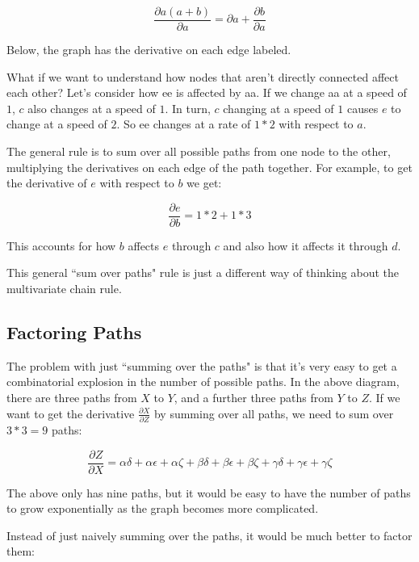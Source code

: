 \documentclass[a4paper,12pt]{report}%
\begin{document}
\begin{equation}
\frac{\partial a(a+b)}{\partial a} = \partial a + \frac{\partial b}{\partial a}
\end{equation}

Below, the graph has the derivative on each edge labeled.

What if we want to understand how nodes that aren’t directly connected affect each other? Let’s consider how ee is affected by aa. If we change aa at a speed of $1$, $c$ also changes at a speed of $1$. In turn, $c$ changing at a speed of $1$ causes $e$ to change at a speed of $2$. So ee changes at a rate of $1*2$ with respect to $a$.

The general rule is to sum over all possible paths from one node to the other, multiplying the derivatives on each edge of the path together. For example, to get the derivative of $e$ with respect to $b$ we get:

\begin{equation}
\frac{\partial e}{\partial b} = 1*2 + 1*3
\end{equation}

This accounts for how $b$ affects $e$ through $c$ and also how it affects it through $d$.

This general ``sum over paths" rule is just a different way of thinking about the multivariate chain rule.

\subsection{Factoring Paths}

The problem with just ``summing over the paths" is that it’s very easy to get a combinatorial explosion in the number of possible paths.
In the above diagram, there are three paths from $X$ to $Y$, and a further three paths from $Y$ to $Z$. If we want to get the derivative $\frac{\partial X} {\partial Z}$ by summing over all paths, we need to sum over $3 * 3=9$ paths:

\begin{equation}
\frac{\partial Z}{\partial X} = \alpha \delta + \alpha \epsilon + \alpha \zeta + \beta \delta + \beta \epsilon + \beta \zeta + \gamma \delta + \gamma \epsilon + \gamma \zeta
\end{equation}

The above only has nine paths, but it would be easy to have the number of paths to grow exponentially as the graph becomes more complicated.

Instead of just naively summing over the paths, it would be much better to factor them:
\end{document}
